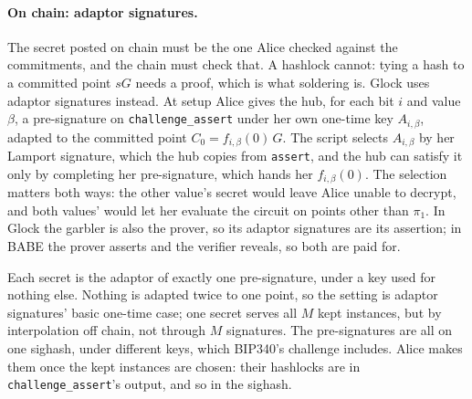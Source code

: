 \documentclass[11pt]{article}
\newcommand{\tx}[1]{\texttt{#1}}
\begin{document}
\paragraph{On chain: adaptor signatures.} The secret posted on chain
must be the one Alice checked against the commitments, and the chain
must check that. A hashlock cannot: tying a hash to a committed point
$s G$ needs a proof, which is what soldering is. Glock uses adaptor
signatures instead. At setup Alice gives the hub, for each bit $i$ and
value $\beta$, a pre-signature on \tx{challenge\_assert} under her own
one-time key $A_{i,\beta}$, adapted to the committed point $C_0 =
f_{i,\beta}(0)\,G$. The script selects $A_{i,\beta}$ by her Lamport
signature, which the hub copies from \tx{assert}, and the hub can
satisfy it only by completing her pre-signature, which hands her
$f_{i,\beta}(0)$. The selection matters both ways: the other value's
secret would leave Alice unable to decrypt, and both values' would let
her evaluate the circuit on points other than $\pi_1$. In Glock the
garbler is also the prover, so its adaptor signatures are its
assertion; in BABE the prover asserts and the verifier reveals, so both
are paid for.

Each secret is the adaptor of exactly one pre-signature, under a key
used for nothing else. Nothing is adapted twice to one point, so the
setting is adaptor signatures' basic one-time case; one secret serves
all $M$ kept instances, but by interpolation off chain, not through
$M$ signatures. The pre-signatures are all on one sighash, under
different keys, which BIP340's challenge includes. Alice makes them
once the kept instances are chosen: their hashlocks are in
\tx{challenge\_assert}'s output, and so in the sighash.
\end{document}
